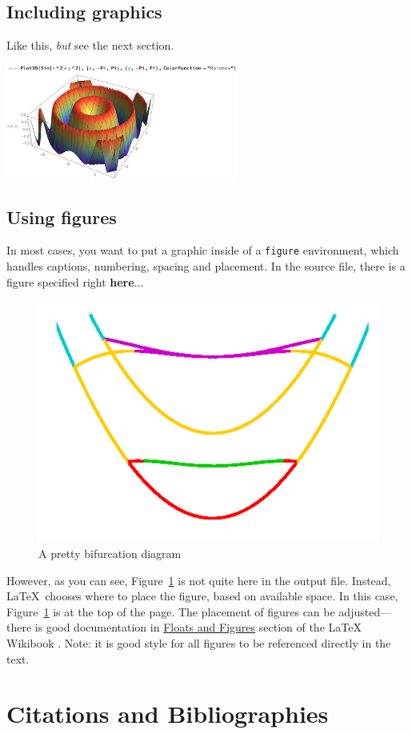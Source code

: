 \documentclass[11pt]{amsart}
\theoremstyle{theorem} %
\theoremstyle{definition}                  %
\theoremstyle{example}                       %
\theoremstyle{remark}                       %
\numberwithin{equation}{section}
\begin{document}
\subsection{Including graphics}

Like this, \emph{but} see the next section. 

\bigskip

\includegraphics[width=3in]{3Dgraph}

\bigskip

 
\subsection{Using figures}

In most cases, you want to put a graphic inside of 
a \texttt{figure} environment, which handles
captions, numbering, spacing and placement. 
In the source file, there is a figure specified right \textbf{here}...
 \begin{figure}
 \centering
 \includegraphics[width=2 in]{perfect_diagram}
\caption{A pretty bifurcation diagram}
 \label{perfect_fig}
 \end{figure}
 However, as you can see, Figure~\ref{perfect_fig} is not quite here in the output file. Instead, \LaTeX\ chooses where
 to place the figure, based on
available space. In this case, Figure\ \ref{perfect_fig}  is at the top of the page. The placement of figures can be adjusted--- there is good documentation
in \href{http://en.wikibooks.org/wiki/LaTeX/Floats,_Figures_and_Captions}{Floats and Figures}  section of the LaTeX Wikibook \cite{wikibook}.
Note: it is good style for all figures to be referenced directly in the text.

\section{Citations and Bibliographies}
\end{document}
